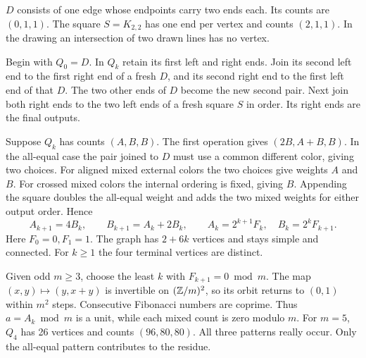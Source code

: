 \documentclass[11pt,letterpaper]{article}
\newcommand{\run}[1]{\par\smallskip{\bfseries\color{ink}#1}\quad}
\begin{document}
\begin{center}
\end{center}
\(D\) consists of one edge whose endpoints carry two ends each. Its counts are \((0,1,1)\). The square \(S=K_{2,2}\) has one end per vertex and counts \((2,1,1)\). In the drawing an intersection of two drawn lines has no vertex.
\run{One iteration.} Begin with \(Q_0=D\). In \(Q_k\) retain its first left and right ends. Join its second left end to the first right end of a fresh \(D\), and its second right end to the first left end of that \(D\). The two other ends of \(D\) become the new second pair. Next join both right ends to the two left ends of a fresh square \(S\) in order. Its right ends are the final outputs.
\run{The recurrence.} Suppose \(Q_k\) has counts \((A,B,B)\). The first operation gives \((2B,A+B,B)\). In the all-equal case the pair joined to \(D\) must use a common different color, giving two choices. For aligned mixed external colors the two choices give weights \(A\) and \(B\). For crossed mixed colors the internal ordering is fixed, giving \(B\). Appending the square doubles the all-equal weight and adds the two mixed weights for either output order. Hence
\[
      A_{k+1}=4B_k,\qquad B_{k+1}=A_k+2B_k,\qquad
      A_k=2^{k+1}F_k,\quad B_k=2^kF_{k+1}.
\]
Here \(F_0=0,F_1=1\). The graph has \(2+6k\) vertices and stays simple and connected. For \(k\ge1\) the four terminal vertices are distinct.
\run{The filter.} Given odd \(m\ge3\), choose the least \(k\) with \(F_{k+1}=0\bmod m\). The map \((x,y)\mapsto(y,x+y)\) is invertible on \((\mathbb Z/m)^2\), so its orbit returns to \((0,1)\) within \(m^2\) steps. Consecutive Fibonacci numbers are coprime. Thus \(a=A_k\bmod m\) is a unit, while each mixed count is zero modulo \(m\). For \(m=5\), \(Q_4\) has 26 vertices and counts \((96,80,80)\). All three patterns really occur. Only the all-equal pattern contributes to the residue.
\end{document}
